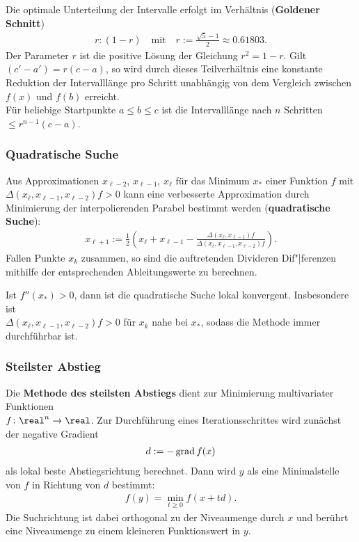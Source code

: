 \linie

Die optimale Unterteilung der Intervalle erfolgt im Verhältnis
(\textbf{Goldener Schnitt})
\begin{align*}
    r : (1 - r) \quad\text{mit}\quad
    r := \frac{\sqrt{5} - 1}{2} \approx 0.61803.
\end{align*}
Der Parameter $r$ ist die positive Lösung der Gleichung $r^2 = 1 - r$.
Gilt $(c' - a') = r(c - a)$, so wird durch dieses Teilverhältnis
eine konstante Reduktion der Intervalllänge pro Schritt unabhängig von
dem Vergleich zwischen $f(x)$ und $f(b)$ erreicht. \\
Für beliebige Startpunkte $a \le b \le c$ ist die Intervalllänge nach
$n$ Schritten $\le r^{n-1} (c - a)$.

\subsubsection{%
    Quadratische Suche%
}

Aus Approximationen $x_{\ell-2}$, $x_{\ell-1}$, $x_\ell$ für das
Minimum $x_\ast$ einer Funktion $f$ mit \\
$\Delta(x_\ell, x_{\ell-1}, x_{\ell-2}) f > 0$
kann eine verbesserte Approximation durch Minimierung der interpolierenden
Parabel bestimmt werden (\textbf{quadratische Suche}):
\begin{align*}
    x_{\ell+1} := \frac{1}{2} \left(x_\ell + x_{\ell-1} -
    \frac{\Delta(x_\ell, x_{\ell-1}) f}
    {\Delta(x_\ell, x_{\ell-1}, x_{\ell-2}) f}\right).
\end{align*}
Fallen Punkte $x_k$ zusammen, so sind die auftretenden Divideren Dif"|ferenzen
mithilfe der entsprechenden Ableitungswerte zu berechnen.

Ist $f''(x_\ast) > 0$, dann ist die quadratische Suche lokal konvergent.
Insbesondere ist \\
$\Delta(x_\ell, x_{\ell-1}, x_{\ell-2}) f > 0$ für $x_k$
nahe bei $x_\ast$, sodass die Methode immer durchführbar ist.

\pagebreak

\subsubsection{%
    Steilster Abstieg%
}

Die \textbf{Methode des steilsten Abstiegs} dient zur Minimierung multivariater
Funktionen \\
$f\colon \real^n \rightarrow \real$.
Zur Durchführung eines Iterationsschrittes wird zunächst der negative Gradient
\begin{align*}
    d := -\operatorname{grad} f(x)
\end{align*}
als lokal beste Abstiegsrichtung berechnet.
Dann wird $y$ als eine Minimalstelle von $f$ in Richtung von $d$ bestimmt:
\begin{align*}
    f(y) = \min_{t \ge 0} f(x + td).
\end{align*}
Die Suchrichtung ist dabei orthogonal zu der Niveaumenge durch $x$ und berührt
eine Niveaumenge zu einem kleineren Funktionswert in $y$.

